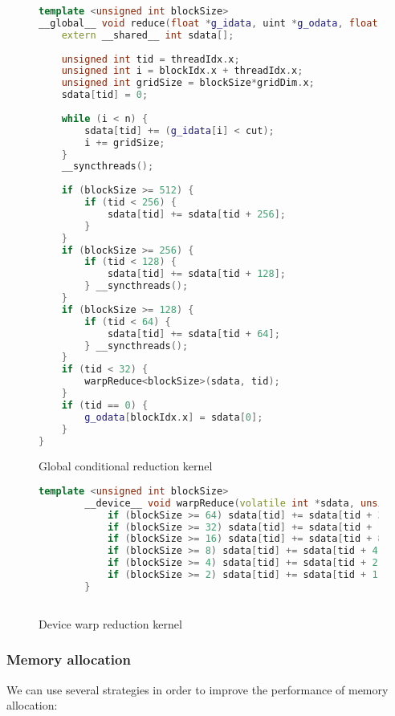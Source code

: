 \documentclass[]{article}
\begin{document}
\begin{figure}[H]
	
	\begin{lstlisting}[language=c++]
template <unsigned int blockSize>
__global__ void reduce(float *g_idata, uint *g_odata, float cut, int n) {
	extern __shared__ int sdata[];
	
	unsigned int tid = threadIdx.x;
	unsigned int i = blockIdx.x + threadIdx.x;
	unsigned int gridSize = blockSize*gridDim.x;
	sdata[tid] = 0;
	
	while (i < n) {
		sdata[tid] += (g_idata[i] < cut);
		i += gridSize;
	}
	__syncthreads();
	
   	if (blockSize >= 512) {
		if (tid < 256) {
			sdata[tid] += sdata[tid + 256];
		}
	}
	if (blockSize >= 256) {
		if (tid < 128) {
			sdata[tid] += sdata[tid + 128];
		} __syncthreads();
	}
	if (blockSize >= 128) {
		if (tid < 64) {
			sdata[tid] += sdata[tid + 64];
		} __syncthreads();
	}
	if (tid < 32) {
		warpReduce<blockSize>(sdata, tid);
	}
	if (tid == 0) {
		g_odata[blockIdx.x] = sdata[0];
	}
}
	\end{lstlisting}
	\caption{Global conditional reduction kernel}
	\label{cuda:reduction}
\end{figure}

\begin{figure}[H]
	\begin{lstlisting}[language=c++]
		template <unsigned int blockSize>
		__device__ void warpReduce(volatile int *sdata, unsigned int tid) {
			if (blockSize >= 64) sdata[tid] += sdata[tid + 32];
			if (blockSize >= 32) sdata[tid] += sdata[tid + 16];
			if (blockSize >= 16) sdata[tid] += sdata[tid + 8];
			if (blockSize >= 8) sdata[tid] += sdata[tid + 4];
			if (blockSize >= 4) sdata[tid] += sdata[tid + 2];
			if (blockSize >= 2) sdata[tid] += sdata[tid + 1];
		}
		
	\end{lstlisting}
	\caption{Device warp reduction kernel}
	\label{cuda:warp-device}
\end{figure}


\subsubsection{Memory allocation}

We can use several strategies in order to improve the performance of memory allocation: 
\end{document}
